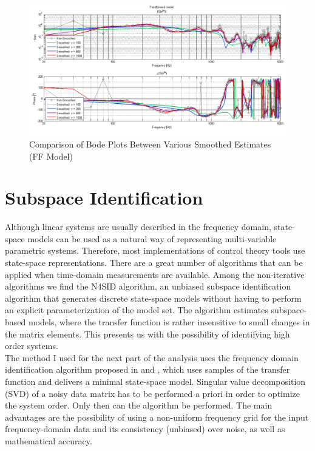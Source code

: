 \begin{figure}[h]
\centering
\includegraphics[width=1.0\textwidth]{pics/FF_Smoothing}
\caption{Comparison of Bode Plots Between Various Smoothed Estimates (FF Model)}
\label{fig:FF_Smoothing}
\end{figure}



\section{Subspace Identification}

Although linear systems are usually described in the frequency domain, state-space models can be used as a natural way of representing multi-variable parametric systems. Therefore, most implementations of control theory tools use state-space representations. There are a great number of algorithms that can be applied when time-domain measurements are available. Among the non-iterative algorithms we find the N4SID algorithm, an unbiased subspace identification algorithm that generates discrete state-space models without having to perform an explicit parameterization of the model set. The algorithm estimates subspace-based models, where the transfer function is rather insensitive to small changes in the matrix elements. This presents us with the possibility of identifying high order systems. \\

The method I used for the next part of the analysis uses the frequency domain identification algorithm proposed in \cite{mckelvey1996subspace} and \cite{van1994n4sid}, which uses samples of the transfer function and delivers a minimal state-space model. Singular value decomposition (SVD) of a noisy data matrix has to be performed a priori in order to optimize the system order.  Only then can the algorithm be performed. The main advantages are the possibility of using a non-uniform frequency grid for the input frequency-domain data and its consistency (unbiased) over noise, as well as mathematical accuracy. 


